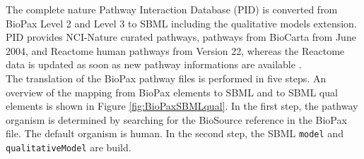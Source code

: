 \documentclass{bioinfo}
\begin{document}
\begin{methods}
%
The complete nature Pathway Interaction Database (PID) is converted from BioPax Level 2 and Level 3 to SBML including the qualitative models extension.
PID provides NCI-Nature curated pathways, pathways from BioCarta from June 2004, and Reactome human pathways from Version 22, whereas the Reactome data is updated as soon as new pathway informations are available \citep{Schaefer2009}.\\
The translation of the BioPax pathway files is performed in five steps.
An overview of the mapping from BioPax elements to SBML and to SBML qual elements is shown in Figure \ref{fig:BioPaxSBMLqual}.
In the first step, the pathway organism is determined by searching for the BioSource reference in the BioPax file.
The default organism is human.
In the second step, the SBML \texttt{model} and \texttt{qualitativeModel} are build.

\end{methods}
\end{document}
